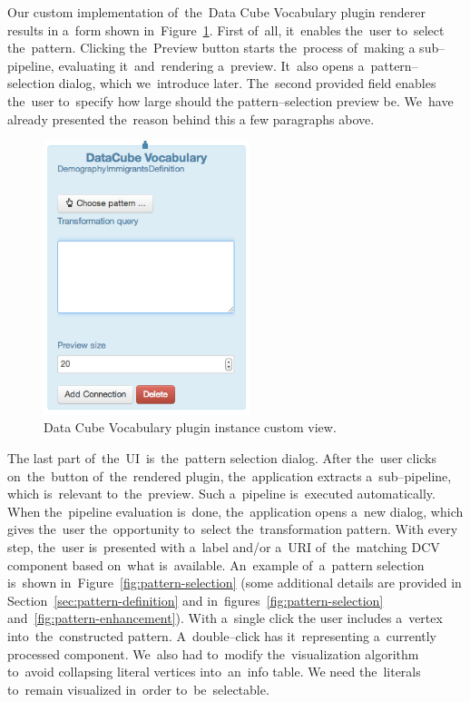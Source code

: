 Our custom implementation of~the~Data Cube Vocabulary plugin renderer results 
in a~form shown in~Figure~\ref{fig:DCV-plugin-view}. First of~all, it~enables the~user to~select the~pattern. Clicking the~Preview button starts the~process of~making a
sub--pipeline, evaluating it~and~rendering a~preview. It~also opens a~pattern--selection
dialog, which we~introduce later. The~second provided field enables the~user to~specify how large should 
the pattern--selection preview be. We~have already presented the~reason behind this 
a few paragraphs above.

\begin{figure}
	\centering
	\includegraphics[width=60mm]{img/custom-dcv-piv.png}
	\caption{Data Cube Vocabulary plugin instance custom view.}
	\label{fig:DCV-plugin-view}
\end{figure}

The last part of~the~UI~is~the~pattern selection dialog. After the~user clicks 
on~the~button of~the~rendered plugin, the~application extracts a~sub--pipeline, 
which is~relevant to~the~preview. Such a~pipeline is~executed
automatically. When the~pipeline evaluation is~done, the~application opens a~new 
dialog, which gives the~user the~opportunity to~select the~transformation 
pattern. With every step, the~user is~presented with a~label and/or a~URI of~the~matching DCV component based on~what is~available. An~example of~a~pattern 
selection is~shown in~Figure~\ref{fig:pattern-selection} (some additional details are provided
in Section~\ref{sec:pattern-definition}
and in~figures~\ref{fig:pattern-selection} and~\ref{fig:pattern-enhancement}).
With a~single click 
the user includes a~vertex into~the~constructed pattern. A~double--click 
has it~representing a~currently processed component. We~also had to~modify the~visualization algorithm to~avoid collapsing literal vertices into~an~info table. 
We need the~literals to~remain visualized in~order to~be~selectable.

